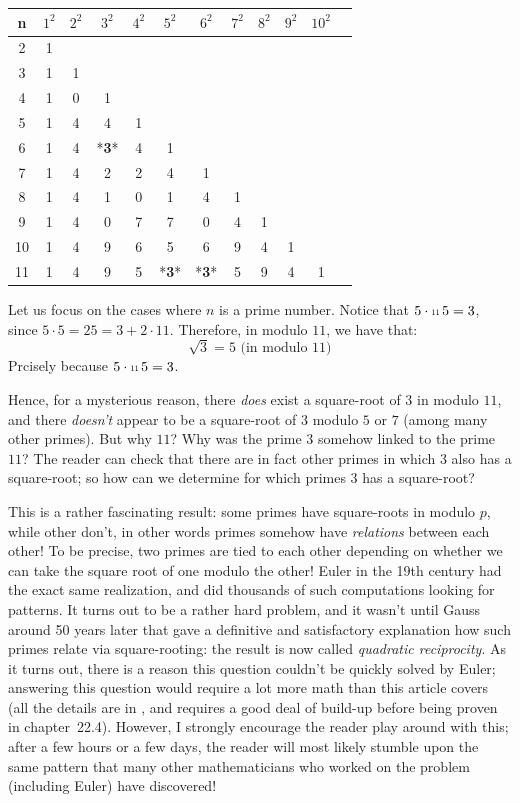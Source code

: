 \documentclass[oneside]{book}
\newcommand\scalemath[2]{\scalebox{#1}{\mbox{\ensuremath{\displaystyle #2}}}}
\newcommand{\Cdot}[1]{\cdot{\scalemath{0.6}{#1}}\,}
\begin{document}
\begin{longtable}{|c||c|c|c|c|c|c|c|c|c|c|c|}
\hline
n & $1^2$ & $2^2$ & $3^2$ & $4^2$ & $5^2$ & $6^2$ & $7^2$ & $8^2$ & $9^2$ & $10^2$\\
\hline
2 & 1 & & & & & & & & & \\
\hline
3 & 1 & 1 & & & & & & & & \\
\hline
4 & 1 & 0 & 1 & & & & & & & \\
\hline
5 & 1 & 4 & 4 & 1 & & & & & & \\
\hline
6 & 1 & 4 & *\textbf{3}* & 4 & 1 & & & & & \\
\hline
7 & 1 & 4 & 2 & 2 & 4 & 1 & & & & \\
\hline
8 & 1 & 4 & 1 & 0 & 1 & 4 & 1 & & & \\
\hline
9 & 1 & 4 & 0 & 7 & 7 & 0 & 4 & 1 & & \\
\hline
10 & 1 & 4 & 9 & 6 & 5 & 6 & 9 & 4 & 1 & \\
\hline
11 & 1 & 4 & 9 & 5 & *\textbf{3}* & *\textbf{3}* & 5 & 9 & 4 & 1 \\
\hline
\end{longtable}

Let us focus on the cases where $n$ is a prime number. Notice that $5\Cdot{11}5 = 3$, since $5\cdot 5 =25
= 3+2\cdot 11$. Therefore, in modulo $11$, we have that:
\[
  \sqrt{3} =5 \text{ (in modulo $11$)}
\]
Prcisely because $5\Cdot{11}5 = 3$.

Hence, for a mysterious reason, there \emph{does} exist a square-root of $3$ in modulo $11$,
and there \emph{doesn't} appear to be a square-root of $3$ modulo $5$ or $7$ (among many
other primes). But
why $11$? Why was the prime $3$ somehow linked to the prime $11$? The reader can check that
there are in fact other primes in which $3$ also has a square-root; so how can we
determine for which primes $3$ has a square-root?

This is a rather fascinating result: some primes have square-roots in modulo $p$, while other don't, in other
words primes somehow have \emph{relations} between each other! To be precise, two primes are tied to each
other depending on whether we can take the square root of one modulo the other! Euler in the 19th century had
the exact same realization, and did thousands of such computations looking for patterns. It turns out to be a
rather hard problem, and it wasn't until Gauss around 50 years later that gave a definitive and satisfactory
explanation how such primes relate via square-rooting: the result is now called \emph{quadratic reciprocity}.
As it turns out, there is a reason this question couldn't be quickly solved by Euler; answering this question
would require a lot more math than this article covers (all the details are in \cite{NateAlgebra}, and
requires a good deal of build-up before being proven in chapter~22.4). However, I strongly encourage the
reader play around with this; after a few hours or a few days, the reader will most likely stumble upon the
same pattern that many other mathematicians who worked on the problem (including Euler) have discovered!
\end{document}
